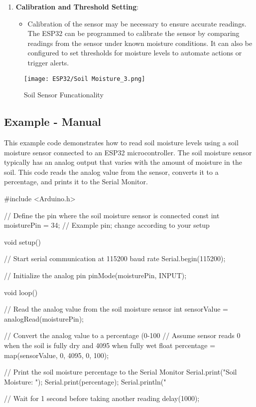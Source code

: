 \begin{enumerate}[label=\arabic*.]
	\item \textbf{Calibration and Threshold Setting}:
	\begin{itemize}
		\item Calibration of the sensor may be necessary to ensure accurate readings. The ESP32 can be programmed to calibrate the sensor by comparing readings from the sensor under known moisture conditions. It can also be configured to set thresholds for moisture levels to automate actions or trigger alerts.
	\end{itemize}
\end{enumerate}

\begin{figure}  
	\begin{center}
		\texttt{[image: ESP32/Soil Moisture\_3.png]}
		\caption{Soil Sensor Funcationality} 
		\label{fig:Python 3.10.}
	\end{center}
\end{figure}	


\subsection{Example - Manual}

This example code demonstrates how to read soil moisture levels using a soil moisture sensor connected to an ESP32 microcontroller. The soil moisture sensor typically has an analog output that varies with the amount of moisture in the soil. This code reads the analog value from the sensor, converts it to a percentage, and prints it to the Serial Monitor.


\begin{Arduino}
	
	
	#include <Arduino.h>
	
	// Define the pin where the soil moisture sensor is connected
	const int moisturePin = 34; // Example pin; change according to your setup
	
	void setup() {
		// Start serial communication at 115200 baud rate
		Serial.begin(115200);
		
		// Initialize the analog pin
		pinMode(moisturePin, INPUT);
	}
	
	void loop() {
		// Read the analog value from the soil moisture sensor
		int sensorValue = analogRead(moisturePin);
		
		// Convert the analog value to a percentage (0-100%
		// Assume sensor reads 0 when the soil is fully dry and 4095 when fully wet
		float percentage = map(sensorValue, 0, 4095, 0, 100);
		
		// Print the soil moisture percentage to the Serial Monitor
		Serial.print("Soil Moisture: ");
		Serial.print(percentage);
		Serial.println("%
		
		// Wait for 1 second before taking another reading
		delay(1000);
	}
	
\end{Arduino}


